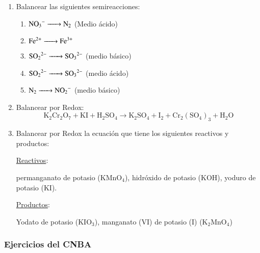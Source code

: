\begin{enumerate}
\item Balancear las siguientes semireacciones:
\begin{enumerate}
    \item $\ce{ NO_3^- -> N_2 }$ (Medio ácido)
    \item $\ce{ Fe^{2+} -> Fe^{3+} }$
    \item $\ce{ SO_2^{\;2-} -> SO_3^{\;2-} }$ (medio básico)
    \item $\ce{ SO_2^{\;2-} -> SO_3^{\;2-} }$ (medio ácido)
    \item $\ce{ N_2 -> NO_2^- }$ (medio básico)
\end{enumerate}


\item Balancear por Redox:
$$\text{K}_2\text{Cr}_2\text{O}_7 + \text{KI} + \text{H}_2\text{SO}_4 \longrightarrow \text{K}_2\text{SO}_4 + \text{I}_2 + \text{Cr}_2(\text{SO}_4)_3 + \text{H}_2\text{O}$$


\item Balancear por Redox la ecuación que tiene los siguientes reactivos y productos:

\underline{Reactivos}:

permanganato de potasio (KMnO$_4$), hidróxido de potasio (KOH), yoduro de potasio (KI).

\skipline
\underline{Productos}:

Yodato de potasio (KIO$_3$), manganato (VI) de potasio (I) (K$_2$MnO$_4$)
\end{enumerate}


\newpage
\subsubsection*{Ejercicios del CNBA}

